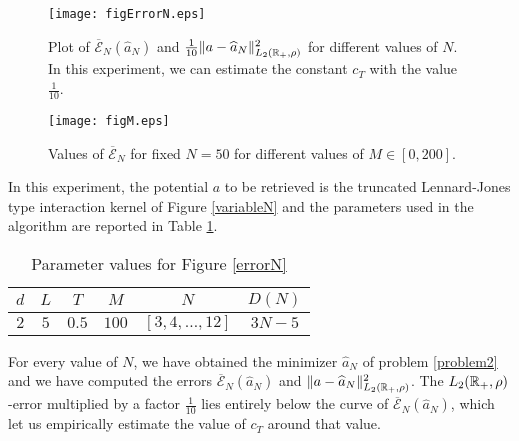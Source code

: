 \begin{figure}[h]
\hspace{-1.2cm}
\begin{minipage}{0.58\textwidth}
\begin{center}
\texttt{[image: figErrorN.eps]}
\end{center}
\caption{Plot of $\overline{\mathcal{E}}_N(\widehat{a}_N)$ and $\frac{1}{10}\|a-\widehat{a}_N\|^2_{L_2(\mathbb{R}_+,\rho)}$ for different values of $N$. In this experiment, we can estimate the constant $c_T$ with the value $\frac{1}{10}$.}\label{errorN}
\end{minipage}
\hspace{0.4cm}
\begin{minipage}{0.55\textwidth}
\begin{center}
\texttt{[image: figM.eps]}
\end{center}
\caption{Values of $\overline{\mathcal{E}}_N$ for fixed $N = 50$ for different values of $M \in [0,200]$.}\label{Mconstr}
\end{minipage}
\end{figure}

In this experiment, the potential $a$ to be retrieved is the truncated Lennard-Jones type interaction kernel of Figure \ref{variableN} and the parameters used in the algorithm are reported in Table \ref{tab:fig3}.

\begin{table}[h]
\begin{center}
\begin{tabular}{ |c|c|c|c|c|c| }
\hline
  $d$ & $L$ & $T$ & $M$ & $N$ & $D(N)$ \\
\hline
\hline
  $2$ & $5$ & $0.5$ & $100$ & $[3,4,\ldots,12]$ & $3N-5$ \\
\hline
\end{tabular}
\end{center}
\vspace{-0.5cm}
\caption{Parameter values for Figure \ref{errorN}} \label{tab:fig3} 
\end{table}

For every value of $N$, we have obtained the minimizer $\widehat{a}_N$ of problem \eqref{problem2} and we have computed the errors $\overline{\mathcal{E}}_N(\widehat{a}_N)$ and $\|a-\widehat{a}_N\|^2_{L_2(\mathbb{R}_+,\rho)}$. The $L_2(\mathbb{R}_+,\rho)$-error multiplied by a factor $\frac{1}{10}$ lies entirely below the curve of $\overline{\mathcal{E}}_N(\widehat{a}_N)$, which let us empirically estimate the value of $c_T$ around that value.

